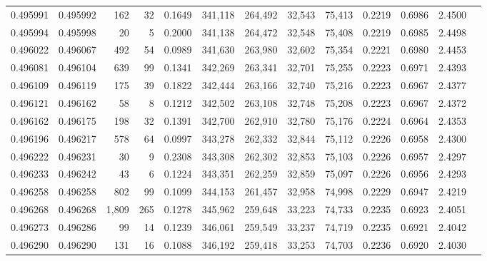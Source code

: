 \begin{tabular}{rrrrrrrrrrrrr}
0.495991 & 0.495992 &   162 &    32 &                                     0.1649 & 341,118 & 264,492 &  32,543 &  75,413 & 0.2219 & 0.6986 & 2.4500 \\
0.495994 & 0.495998 &    20 &     5 &                                     0.2000 & 341,138 & 264,472 &  32,548 &  75,408 & 0.2219 & 0.6985 & 2.4498 \\
0.496022 & 0.496067 &   492 &    54 &                                     0.0989 & 341,630 & 263,980 &  32,602 &  75,354 & 0.2221 & 0.6980 & 2.4453 \\
0.496081 & 0.496104 &   639 &    99 &                                     0.1341 & 342,269 & 263,341 &  32,701 &  75,255 & 0.2223 & 0.6971 & 2.4393 \\
0.496109 & 0.496119 &   175 &    39 &                                     0.1822 & 342,444 & 263,166 &  32,740 &  75,216 & 0.2223 & 0.6967 & 2.4377 \\
0.496121 & 0.496162 &    58 &     8 &                                     0.1212 & 342,502 & 263,108 &  32,748 &  75,208 & 0.2223 & 0.6967 & 2.4372 \\
0.496162 & 0.496175 &   198 &    32 &                                     0.1391 & 342,700 & 262,910 &  32,780 &  75,176 & 0.2224 & 0.6964 & 2.4353 \\
0.496196 & 0.496217 &   578 &    64 &                                     0.0997 & 343,278 & 262,332 &  32,844 &  75,112 & 0.2226 & 0.6958 & 2.4300 \\
0.496222 & 0.496231 &    30 &     9 &                                     0.2308 & 343,308 & 262,302 &  32,853 &  75,103 & 0.2226 & 0.6957 & 2.4297 \\
0.496233 & 0.496242 &    43 &     6 &                                     0.1224 & 343,351 & 262,259 &  32,859 &  75,097 & 0.2226 & 0.6956 & 2.4293 \\
0.496258 & 0.496258 &   802 &    99 &                                     0.1099 & 344,153 & 261,457 &  32,958 &  74,998 & 0.2229 & 0.6947 & 2.4219 \\
0.496268 & 0.496268 & 1,809 &   265 &                                     0.1278 & 345,962 & 259,648 &  33,223 &  74,733 & 0.2235 & 0.6923 & 2.4051 \\
0.496273 & 0.496286 &    99 &    14 &                                     0.1239 & 346,061 & 259,549 &  33,237 &  74,719 & 0.2235 & 0.6921 & 2.4042 \\
0.496290 & 0.496290 &   131 &    16 &                                     0.1088 & 346,192 & 259,418 &  33,253 &  74,703 & 0.2236 & 0.6920 & 2.4030 \\

\end{tabular}
